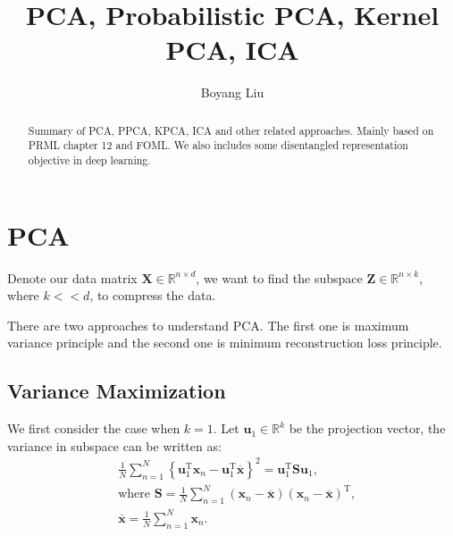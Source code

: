 \documentclass{article}
\title{PCA, Probabilistic PCA, Kernel PCA, ICA}
\author{%
 Boyang Liu \\
}
\begin{document}
\maketitle

\begin{abstract}
  Summary of PCA, PPCA, KPCA, ICA and other related approaches. Mainly based on PRML chapter 12 and FOML. We also includes some disentangled representation objective in deep learning.
\end{abstract}

\section{PCA}
Denote our data matrix $\mathbf{X} \in \mathbb{R}^{n \times d}$, we want to find the subspace $\mathbf{Z} \in \mathbb{R}^{n \times k}$, where $k << d$, to compress the data.

There are two approaches to understand PCA. The first one is maximum variance principle and the second one is minimum reconstruction loss principle.

\subsection{Variance Maximization}
We first consider the case when $k = 1$. Let $\mathbf{u}_1 \in \mathbb{R}^{k}$ be the projection vector, the variance in subspace can be written as: 
\begin{align*}
&\frac{1}{N} \sum_{n=1}^{N}\left\{\mathbf{u}_{1}^{\mathrm{T}} \mathbf{x}_{n}-\mathbf{u}_{1}^{\mathrm{T}} \overline{\mathbf{x}}\right\}^{2}=\mathbf{u}_{1}^{\mathrm{T}} \mathbf{S} \mathbf{u}_{1}, \\
& \text{where } \mathbf{S}=\frac{1}{N} \sum_{n=1}^{N}\left(\mathbf{x}_{n}-\overline{\mathbf{x}}\right)\left(\mathbf{x}_{n}-\overline{\mathbf{x}}\right)^{\mathrm{T}},\\
&\overline{\mathbf{x}}=\frac{1}{N} \sum_{n=1}^{N} \mathbf{x}_{n}.
\end{align*}
\end{document}
